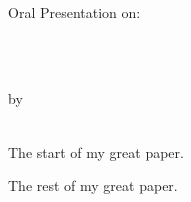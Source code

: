 \documentclass{biosmasters}
\makeatletter
\let\thetitle\@title
\let\theauthor\@author
\let\thedate\@date
\makeatother
\begin{document}
\begin{titlepage}
\begin{center}
\begin{minipage}{0.4\textwidth}
\begin{flushleft}
\vspace{.15in}

\end{flushleft}
\end{minipage}\\[1cm]

\end{center}

\begin{minipage}{0.9\textwidth}
\begin{flushleft}
Oral Presentation on:  \hspace{.5in} \thedate \\[.5cm]
\hspace{.3in}
\end{flushleft}
\end{minipage}\\


\vfill %

\end{titlepage}



\tableofcontents %
\newpage



\doublespacing

\thispagestyle{firstpage}

\begin{center}
\thetitle \\[1cm]
by \\[1cm]
\theauthor \\
\end{center}
\vspace{1.1cm}

The start of my great paper.

\restoregeometry
\doublespacing

The rest of my great paper.

\end{document}
